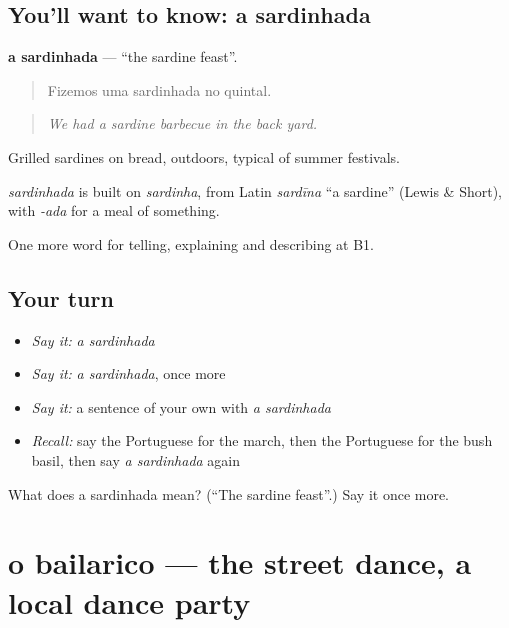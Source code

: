 \subsection*{You'll want to know: a sardinhada}
\textbf{a sardinhada} — \textquotedblleft{}the sardine feast\textquotedblright{}.

\begin{quote}
Fizemos uma sardinhada no quintal.
\end{quote}

\begin{quote}
\emph{We had a sardine barbecue in the back yard.}
\end{quote}

Grilled sardines on bread, outdoors, typical of summer festivals.

\begin{cousinweb}
\emph{sardinhada} is built on \emph{sardinha}, from Latin \emph{sardīna} \textquotedblleft{}a sardine\textquotedblright{} (Lewis \& Short), with \emph{-ada} for a meal of something.
\end{cousinweb}

\begin{grammarlens}[title={What you've built}]
One more word for telling, explaining and describing at B1.
\end{grammarlens}

\subsection*{Your turn}
\begin{itemize}
\raggedright
  \item \emph{Say it:} \emph{a sardinhada}
  \item \emph{Say it:} \emph{a sardinhada}, once more
  \item \emph{Say it:} a sentence of your own with \emph{a sardinhada}
  \item \emph{Recall:} say the Portuguese for the march, then the Portuguese for the bush basil, then say \emph{a sardinhada} again
\end{itemize}

\begin{tcolorbox}[breakable,colback=teal!4,colframe=teal!35!black,title={Before you move on}]
What does a sardinhada mean? (\textquotedblleft{}The sardine feast\textquotedblright{}.) Say it once more.
\end{tcolorbox}
\section[o bailarico]{o bailarico — the street dance, a local dance party}

